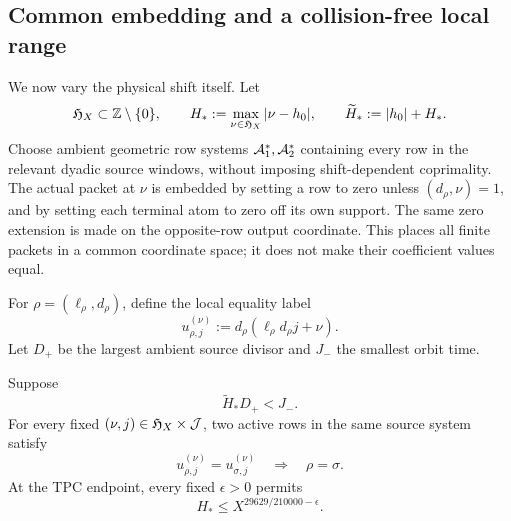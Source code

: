 \subsection{Common embedding and a collision-free local range}

We now vary the physical shift itself.  Let
\begin{equation}
 \mathfrak H_X\subset\mathbb Z\setminus\{0\},\qquad
 H_*:=\max_{\nu\in\mathfrak H_X}|\nu-h_0|,
 \qquad
 \widetilde H_*:=|h_0|+H_*.
 \label{eq:tpc46-local-shift-set}
\end{equation}
Choose ambient geometric row systems
\(\mathcal A_1^*,\mathcal A_2^*\) containing every row in the relevant dyadic source
windows, without imposing shift-dependent coprimality.  The actual
packet at \(\nu\) is embedded by setting a row to zero unless
\((d_\rho,\nu)=1\), and by setting each terminal atom to zero off its
own support.  The same zero extension is made on the opposite-row output
coordinate.  This places all finite packets in a common coordinate
space; it does not make their coefficient values equal.

For \(\rho=(\ell_\rho,d_\rho)\), define the local equality label
\begin{equation}
 u_{\rho,j}^{(\nu)}
 :=d_\rho(\ell_\rho d_\rho j+\nu).
 \label{eq:tpc46-local-label}
\end{equation}
Let \(D_+\) be the largest ambient source divisor and \(J_-\) the
smallest orbit time.

\begin{lemma}
\label{lem:tpc46-local-label-rigidity}
Suppose
\begin{equation}
 \widetilde H_*D_+<J_-.
 \label{eq:tpc46-local-rigidity-condition}
\end{equation}
For every fixed \((\nu,j)\in\mathfrak H_X\times\mathcal J\), two active rows
in the same source system satisfy
\begin{equation}
 u_{\rho,j}^{(\nu)}=u_{\sigma,j}^{(\nu)}
 \quad\Longrightarrow\quad \rho=\sigma.
 \label{eq:tpc46-local-label-injective}
\end{equation}
At the TPC endpoint, every fixed \(\epsilon>0\) permits
\begin{equation}
 H_*\le
 X^{29629/210000-\epsilon}.
 \label{eq:tpc46-local-shift-exponent}
\end{equation}
\end{lemma}

